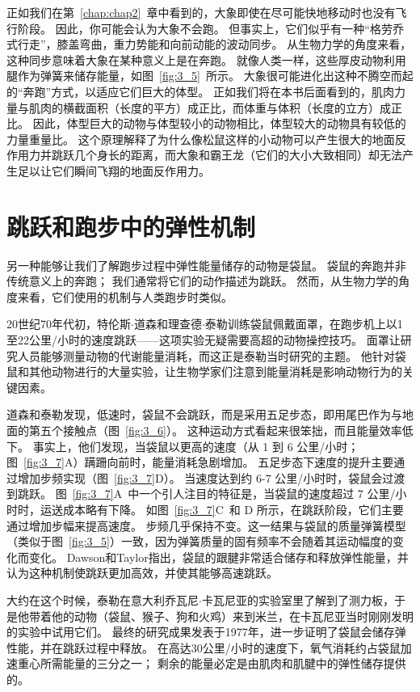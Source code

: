 正如我们在第~\ref{chap:chap2}~章中看到的，大象即使在尽可能快地移动时也没有飞行阶段。
因此，你可能会认为大象不会跑。
但事实上，它们似乎有一种“格劳乔式行走”，膝盖弯曲，重力势能和向前动能的波动同步。
从生物力学的角度来看，这种同步意味着大象在某种意义上是在奔跑。
就像人类一样，这些厚皮动物利用腿作为弹簧来储存能量，如图~\ref{fig:3_5}~所示。
大象很可能进化出这种不腾空而起的“奔跑”方式，以适应它们巨大的体型。
正如我们将在本书后面看到的，肌肉力量与肌肉的横截面积（长度的平方）成正比，而体重与体积（长度的立方）成正比。
因此，体型巨大的动物与体型较小的动物相比，体型较大的动物具有较低的力量重量比。
这个原理解释了为什么像松鼠这样的小动物可以产生很大的地面反作用力并跳跃几个身长的距离，而大象和霸王龙（它们的大小大致相同）却无法产生足以让它们瞬间飞翔的地面反作用力。



\section{跳跃和跑步中的弹性机制}

另一种能够让我们了解跑步过程中弹性能量储存的动物是袋鼠。
袋鼠的奔跑并非传统意义上的奔跑；
我们通常将它们的动作描述为跳跃。
然而，从生物力学的角度来看，它们使用的机制与人类跑步时类似。


20世纪70年代初，特伦斯$\cdot$道森和理查德$\cdot$泰勒训练袋鼠佩戴面罩，在跑步机上以1至22公里/小时的速度跳跃——这项实验无疑需要高超的动物操控技巧。
面罩让研究人员能够测量动物的代谢能量消耗，而这正是泰勒当时研究的主题。
他针对袋鼠和其他​​动物进行的大量实验，让生物学家们注意到能量消耗是影响动物行为的关键因素。


道森和泰勒发现，低速时，袋鼠不会跳跃，而是采用五足步态，即用尾巴作为与地面的第五个接触点（图~\ref{fig:3_6}）。
这种运动方式看起来很笨拙，而且能量效率低下。
事实上，他们发现，当袋鼠以更高的速度（从 1 到 6 公里/小时；图~\ref{fig:3_7}A）蹒跚向前时，能量消耗急剧增加。
五足步态下速度的提升主要通过增加步频实现（图~\ref{fig:3_7}D）。
当速度达到约 6-7 公里/小时时，袋鼠会过渡到跳跃。
图~\ref{fig:3_7}A~中一个引人注目的特征是，当袋鼠的速度超过 7 公里/小时时，运送成本略有下降。
如图~\ref{fig:3_7}C~和 D 所示，在跳跃阶段，它们主要通过增加步幅来提高速度。
步频几乎保持不变。这一结果与袋鼠的质量弹簧模型（类似于图~\ref{fig:3_5}）一致，因为弹簧质量的固有频率不会随着其运动幅度的变化而变化。
Dawson和Taylor指出，袋鼠的跟腱非常适合储存和释放弹性能量，并认为这种机制使跳跃更加高效，并使其能够高速跳跃。


大约在这个时候，泰勒在意大利乔瓦尼$\cdot$卡瓦尼亚的实验室里了解到了测力板，于是他带着他的动物（袋鼠、猴子、狗和火鸡）来到米兰，在卡瓦尼亚当时刚刚发明的实验中试用它们。
最终的研究成果发表于1977年，进一步证明了袋鼠会储存弹性能，并在跳跃过程中释放。
在高达30公里/小时的速度下，氧气消耗约占袋鼠加速重心所需能量的三分之一；
剩余的能量必定是由肌肉和肌腱中的弹性储存提供的。


